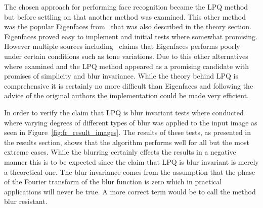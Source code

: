 The chosen approach for performing face recognition became the LPQ method but before settling on that another method was examined. This other method was the popular Eigenfaces from~\cite{eigenface2} that was also described in the theory section. Eigenfaces proved easy to implement and initial tests where somewhat promising. However multiple sources including~\cite{belhumeur1997eigenfaces} claims that Eigenfaces performs poorly under certain conditions such as tone variations. Due to this other alternatives where examined and the LPQ method appeared as a promising candidate with promises of simplicity and blur invariance. While the theory behind LPQ is comprehensive it is certainly no more difficult than Eigenfaces and following the advice of the original authors the implementation could be made very efficient.

In order to verify the claim that LPQ is blur invariant tests where conducted where varying degrees of different types of blur was applied to the input image as seen in Figure~\ref{fig:fr_result_images}. The results of these tests, as presented in the results section, shows that the algorithm performs well for all but the most extreme cases. While the blurring certainly effects the results in a negative manner this is to be expected since the claim that LPQ is blur invariant is merely a theoretical one. The blur invariance comes from the assumption that the phase of the Fourier transform of the blur function is zero which in practical applications will never be true. A more correct term would be to call the method blur resistant.

